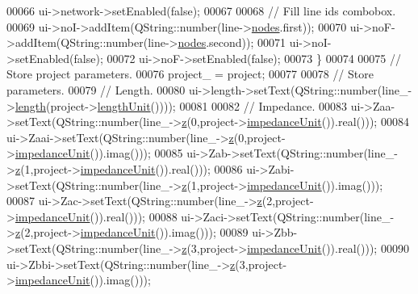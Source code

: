 \begin{DoxyCode}
00066     ui->network->setEnabled(\textcolor{keyword}{false});
00067 
00068     \textcolor{comment}{// Fill line ids combobox.}
00069     ui->noI->addItem(QString::number(line->\hyperlink{class_line_afd17c40d656e6a8d677cb22df5f0c70b}{nodes}.first));
00070     ui->noF->addItem(QString::number(line->\hyperlink{class_line_afd17c40d656e6a8d677cb22df5f0c70b}{nodes}.second));
00071     ui->noI->setEnabled(\textcolor{keyword}{false});
00072     ui->noF->setEnabled(\textcolor{keyword}{false});
00073   \}
00074 
00075   \textcolor{comment}{// Store project parameters.}
00076   project\_ = project;
00077 
00078   \textcolor{comment}{// Store parameters.}
00079   \textcolor{comment}{// Length.}
00080   ui->length->setText(QString::number(line\_->\hyperlink{group___models_gae2e4500d0fa60dcc2ecb08b2c96954f9}{length}(project->\hyperlink{class_project_a40cd2f59a4a708897e5997942c046f4d}{lengthUnit}())));
00081 
00082   \textcolor{comment}{// Impedance.}
00083   ui->Zaa->setText(QString::number(line\_->\hyperlink{group___models_ga0b44ccb2f14635c42d7eab3fe8940692}{z}(0,project->\hyperlink{class_project_ad0725b9aa4445dd6d21d4e15df482d3b}{impedanceUnit}()).real()));
00084   ui->Zaai->setText(QString::number(line\_->\hyperlink{group___models_ga0b44ccb2f14635c42d7eab3fe8940692}{z}(0,project->\hyperlink{class_project_ad0725b9aa4445dd6d21d4e15df482d3b}{impedanceUnit}()).imag()));
00085   ui->Zab->setText(QString::number(line\_->\hyperlink{group___models_ga0b44ccb2f14635c42d7eab3fe8940692}{z}(1,project->\hyperlink{class_project_ad0725b9aa4445dd6d21d4e15df482d3b}{impedanceUnit}()).real()));
00086   ui->Zabi->setText(QString::number(line\_->\hyperlink{group___models_ga0b44ccb2f14635c42d7eab3fe8940692}{z}(1,project->\hyperlink{class_project_ad0725b9aa4445dd6d21d4e15df482d3b}{impedanceUnit}()).imag()));
00087   ui->Zac->setText(QString::number(line\_->\hyperlink{group___models_ga0b44ccb2f14635c42d7eab3fe8940692}{z}(2,project->\hyperlink{class_project_ad0725b9aa4445dd6d21d4e15df482d3b}{impedanceUnit}()).real()));
00088   ui->Zaci->setText(QString::number(line\_->\hyperlink{group___models_ga0b44ccb2f14635c42d7eab3fe8940692}{z}(2,project->\hyperlink{class_project_ad0725b9aa4445dd6d21d4e15df482d3b}{impedanceUnit}()).imag()));
00089   ui->Zbb->setText(QString::number(line\_->\hyperlink{group___models_ga0b44ccb2f14635c42d7eab3fe8940692}{z}(3,project->\hyperlink{class_project_ad0725b9aa4445dd6d21d4e15df482d3b}{impedanceUnit}()).real()));
00090   ui->Zbbi->setText(QString::number(line\_->\hyperlink{group___models_ga0b44ccb2f14635c42d7eab3fe8940692}{z}(3,project->\hyperlink{class_project_ad0725b9aa4445dd6d21d4e15df482d3b}{impedanceUnit}()).imag()));

\end{DoxyCode}
